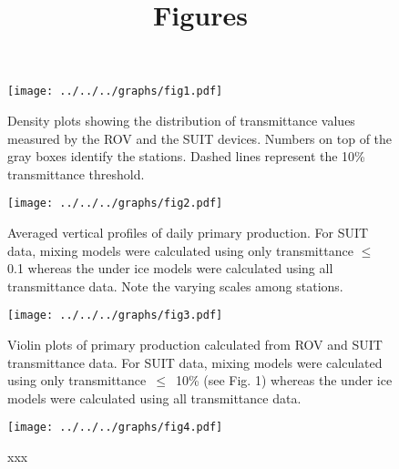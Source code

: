\documentclass[12pt,a4paper]{scrartcl}
\title{Figures}
\date{}
\begin{document}
\maketitle

\begin{figure}[h]
	\centering
	\texttt{[image: ../../../graphs/fig1.pdf]}
	\caption{Density plots showing the distribution of transmittance values measured by the ROV and the SUIT devices. Numbers on top of the gray boxes identify the stations. Dashed lines represent the 10\% transmittance threshold.}
\end{figure}

\clearpage
\newpage

\begin{figure}[h]
	\centering
	\texttt{[image: ../../../graphs/fig2.pdf]}
	\caption{Averaged vertical profiles of daily primary production. For SUIT data, mixing models were calculated using only transmittance $\le$ 0.1 whereas the under ice models were calculated using all transmittance data. Note the varying scales among stations.}
\end{figure}

\clearpage
\newpage

\begin{figure}[h]
	\centering
	\texttt{[image: ../../../graphs/fig3.pdf]}
	\caption{Violin plots of primary production calculated from ROV and SUIT transmittance data. For SUIT data, mixing models were calculated using only transmittance~$\le$~10\% (see Fig. 1) whereas the under ice models were calculated using all transmittance data.}
\end{figure}

\clearpage
\newpage

\begin{figure}[h]
	\centering
	\texttt{[image: ../../../graphs/fig4.pdf]}
	\caption{xxx}
\end{figure}
\end{document}
